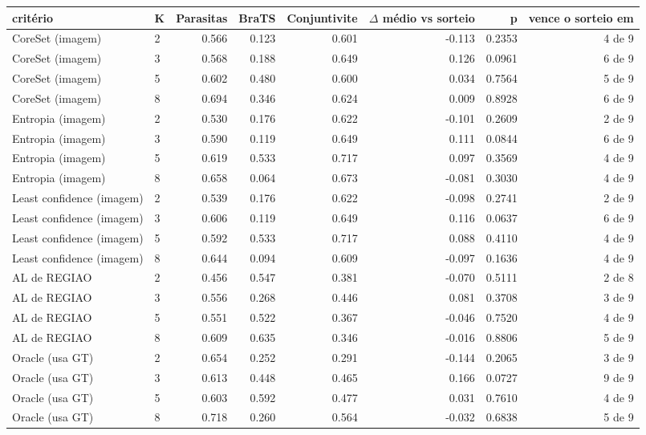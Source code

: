 \begin{tabular}{llrrrrrr}
\hline
critério & K & Parasitas & BraTS & Conjuntivite & $\Delta$ médio vs sorteio & p & vence o sorteio em \\
\hline
CoreSet (imagem) & 2 & 0.566 & 0.123 & 0.601 & -0.113 & 0.2353 & 4 de 9 \\
CoreSet (imagem) & 3 & 0.568 & 0.188 & 0.649 & 0.126 & 0.0961 & 6 de 9 \\
CoreSet (imagem) & 5 & 0.602 & 0.480 & 0.600 & 0.034 & 0.7564 & 5 de 9 \\
CoreSet (imagem) & 8 & 0.694 & 0.346 & 0.624 & 0.009 & 0.8928 & 6 de 9 \\
Entropia (imagem) & 2 & 0.530 & 0.176 & 0.622 & -0.101 & 0.2609 & 2 de 9 \\
Entropia (imagem) & 3 & 0.590 & 0.119 & 0.649 & 0.111 & 0.0844 & 6 de 9 \\
Entropia (imagem) & 5 & 0.619 & 0.533 & 0.717 & 0.097 & 0.3569 & 4 de 9 \\
Entropia (imagem) & 8 & 0.658 & 0.064 & 0.673 & -0.081 & 0.3030 & 4 de 9 \\
Least confidence (imagem) & 2 & 0.539 & 0.176 & 0.622 & -0.098 & 0.2741 & 2 de 9 \\
Least confidence (imagem) & 3 & 0.606 & 0.119 & 0.649 & 0.116 & 0.0637 & 6 de 9 \\
Least confidence (imagem) & 5 & 0.592 & 0.533 & 0.717 & 0.088 & 0.4110 & 4 de 9 \\
Least confidence (imagem) & 8 & 0.644 & 0.094 & 0.609 & -0.097 & 0.1636 & 4 de 9 \\
AL de REGIAO & 2 & 0.456 & 0.547 & 0.381 & -0.070 & 0.5111 & 2 de 8 \\
AL de REGIAO & 3 & 0.556 & 0.268 & 0.446 & 0.081 & 0.3708 & 3 de 9 \\
AL de REGIAO & 5 & 0.551 & 0.522 & 0.367 & -0.046 & 0.7520 & 4 de 9 \\
AL de REGIAO & 8 & 0.609 & 0.635 & 0.346 & -0.016 & 0.8806 & 5 de 9 \\
Oracle (usa GT) & 2 & 0.654 & 0.252 & 0.291 & -0.144 & 0.2065 & 3 de 9 \\
Oracle (usa GT) & 3 & 0.613 & 0.448 & 0.465 & 0.166 & 0.0727 & 9 de 9 \\
Oracle (usa GT) & 5 & 0.603 & 0.592 & 0.477 & 0.031 & 0.7610 & 4 de 9 \\
Oracle (usa GT) & 8 & 0.718 & 0.260 & 0.564 & -0.032 & 0.6838 & 5 de 9 \\
\hline
\end{tabular}
